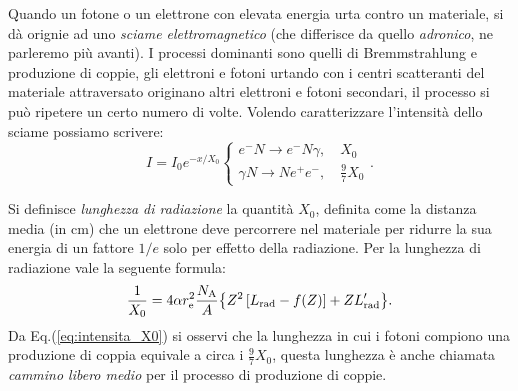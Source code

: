 Quando un fotone o un elettrone con elevata energia urta contro un materiale, si dà orignie ad uno \emph{sciame elettromagnetico} (che differisce da quello \emph{adronico}, ne parleremo più avanti). I processi dominanti sono quelli di Bremmstrahlung e produzione di coppie, gli elettroni e fotoni urtando con i centri scatteranti del materiale attraversato originano altri elettroni e fotoni secondari, il processo si può ripetere un certo numero di volte. Volendo caratterizzare l'intensità dello sciame possiamo scrivere:
\begin{equation}
    I = I_0e^{-x/X_0}   \begin{cases}
                            e^- N \rightarrow e^- N \gamma, \quad X_0 \\
                            \gamma N \rightarrow N e^+ e^-, \quad \frac{9}{7}X_0
                        \end{cases}. 
    \label{eq:intensita_X0}      
\end{equation}
\begin{definition}
    Si definisce \emph{lunghezza di radiazione} la quantità $X_0$, definita come la distanza media (in cm) che un elettrone deve percorrere nel materiale per ridurre la sua energia di un fattore $1/e$ solo per effetto della radiazione. Per la lunghezza di radiazione vale la seguente formula:
    \begin{equation*}
        \frac{1}{X_0} = 4\alpha r_\textup{e}^2\frac{N_\textup{A}}{A} \bigl\{ Z^2\left[L_\textup{rad} - f(Z)\right] + ZL_\textup{rad}'\bigr\}. 
    \end{equation*}
    Da Eq.(\ref{eq:intensita_X0}) si osservi che la lunghezza in cui i fotoni compiono una produzione di coppia equivale a circa i $\frac{9}{7}X_0$, questa lunghezza è anche chiamata \emph{cammino libero medio} per il processo di produzione di coppie.
\end{definition}

